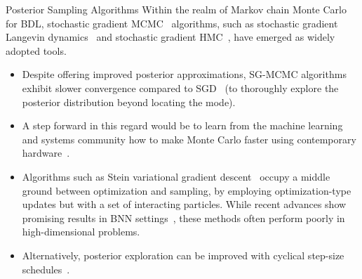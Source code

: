 \documentclass[9pt]{beamer}
\begin{document}
\begin{frame}{Posterior Sampling Algorithms}
Within the realm of Markov chain Monte Carlo~\citep[MCMC;][]{brooks2011handbook} for BDL, \alert{stochastic gradient MCMC}~\citep[SG-MCMC;][]{nemeth2021stochastic} algorithms, such as stochastic gradient Langevin dynamics~\citep[SG-LD;][]{welling2011bayesian} and stochastic gradient HMC~\citep[SG-HMC;][]{chen2014stochastic}, have emerged as widely adopted tools. 
\begin{itemize}[<+->]
	\item Despite offering \alert{improved posterior approximations}, SG-MCMC algorithms exhibit \alert{slower convergence compared to SGD}~\citep{Robbins1951ASA} (to thoroughly explore the posterior distribution beyond locating the mode). 
	\item A step forward in this regard would be to learn from the machine learning and systems community how to make Monte Carlo faster using \alert{contemporary hardware}~\citep{zhang2022low,wang2023enhancing}. %
	\item Algorithms such as \alert{Stein variational gradient descent}~\citep[SVGD;][]{liu2016stein} occupy a \alert{middle ground between optimization and sampling}, by employing optimization-type updates but with a set of interacting particles. While recent advances show promising results in BNN settings~\citep{dangelo2021stein, dangelo2021repulsive, pielok2022approximate}, these methods often perform poorly in high-dimensional problems.
	\item Alternatively, posterior exploration can be improved with cyclical step-size schedules~\citep{zhang2019cyclical}.
\end{itemize}
\end{frame}
\end{document}
